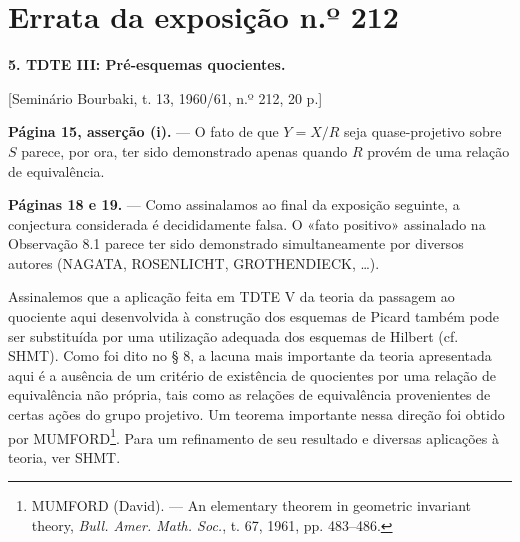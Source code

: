 \clearpage
\chapter*{Errata da exposição n.º 212}
\setcounter{footnote}{2}

\noindent\textbf{5. TDTE III: Pré-esquemas quocientes.}

\begin{center}
[Seminário Bourbaki, t. 13, 1960/61, n.º 212, 20 p.]
\end{center}

\noindent\textbf{Página 15, asserção (i).} --- O fato de que $Y=X/R$ seja
quase-projetivo sobre $S$ parece, por ora, ter sido demonstrado apenas quando
$R$ provém de uma relação de equivalência.

\noindent\textbf{Páginas 18 e 19.} --- Como assinalamos ao final da exposição
seguinte, a conjectura considerada é decididamente falsa. O «fato positivo»
assinalado na Observação 8.1 parece ter sido demonstrado simultaneamente por
diversos autores (NAGATA, ROSENLICHT, GROTHENDIECK, \ldots).

Assinalemos que a aplicação feita em TDTE V da teoria da passagem ao quociente
aqui desenvolvida à construção dos esquemas de Picard também pode ser
substituída por uma utilização adequada dos esquemas de Hilbert (cf. SHMT).
Como foi dito no § 8, a lacuna mais importante da teoria apresentada
aqui é a ausência de um critério de existência de quocientes por uma relação de
equivalência não própria, tais como as relações de equivalência provenientes de
certas ações do grupo projetivo. Um teorema importante nessa direção foi obtido
por MUMFORD\footnote{MUMFORD (David). --- An elementary theorem in geometric
invariant theory, \emph{Bull. Amer. Math. Soc.}, t. 67, 1961, pp. 483--486.}.
Para um refinamento de seu resultado e diversas aplicações à teoria, ver SHMT.
